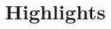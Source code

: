 \documentclass[Afour,sagev,times]{sagej}
\begin{document}
\runninghead{\shorttitle}
\title{\papertitle}

\begin{abstract}

\end{abstract}

\keywords{\paperkeywords}

\maketitle

\section*{Highlights}
\label{sec:highlights}

\end{document}
